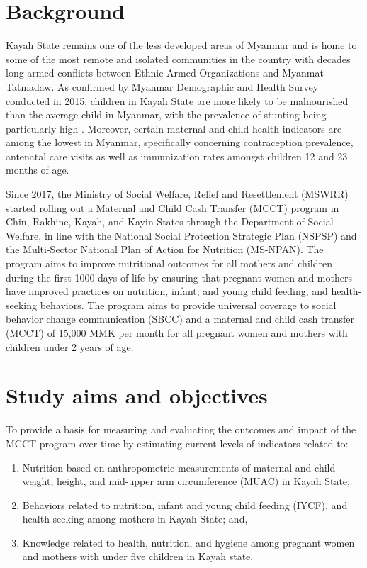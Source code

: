 \documentclass[12pt,a4paper]{article}
\begin{document}
\newpage

\hypertarget{background}{%
\section{Background}\label{background}}

Kayah State remains one of the less developed areas of Myanmar and is home to some of the most remote and isolated communities in the country with decades long armed conflicts between Ethnic Armed Organizations and Myanmat Tatmadaw. As confirmed by Myanmar Demographic and Health Survey conducted in 2015, children in Kayah State are more likely to be malnourished than the average child in Myanmar, with the prevalence of stunting being particularly high \citep{MinistryofHealthandSports-MoHS/Myanmar2017}. Moreover, certain maternal and child health indicators are among the lowest in Myanmar, specifically concerning contraception prevalence, antenatal care visits as well as immunization rates amongst children 12 and 23 months of age.

Since 2017, the Ministry of Social Welfare, Relief and Resettlement (MSWRR) started rolling out a Maternal and Child Cash Transfer (MCCT) program in Chin, Rakhine, Kayah, and Kayin States through the Department of Social Welfare, in line with the National Social Protection Strategic Plan (NSPSP) and the Multi-Sector National Plan of Action for Nutrition (MS-NPAN). The program aims to improve nutritional outcomes for all mothers and children during the first 1000 days of life by ensuring that pregnant women and mothers have improved practices on nutrition, infant, and young child feeding, and health-seeking behaviors. The program aims to provide universal coverage to social behavior change communication (SBCC) and a maternal and child cash transfer (MCCT) of 15,000 MMK per month for all pregnant women and mothers with children under 2 years of age.

\hypertarget{objectives}{%
\section{Study aims and objectives}\label{objectives}}

To provide a basis for measuring and evaluating the outcomes and impact of the MCCT program over time by estimating current levels of indicators related to:

\begin{enumerate}
\def\labelenumi{\arabic{enumi}.}
\item
  Nutrition based on anthropometric measurements of maternal and child weight, height, and mid-upper arm circumference (MUAC) in Kayah State;
\item
  Behaviors related to nutrition, infant and young child feeding (IYCF), and health-seeking among mothers in Kayah State; and,
\item
  Knowledge related to health, nutrition, and hygiene among pregnant women and mothers with under five children in Kayah state.
\end{enumerate}
\end{document}
